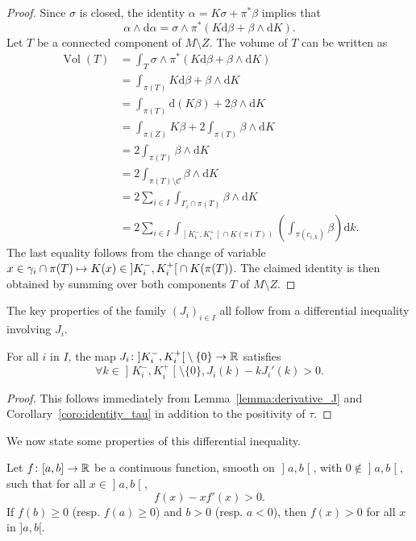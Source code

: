 \documentclass[AHL,Unicode,longabstracts]{cedram}
\DeclareMathOperator{\vol}{Vol}
\newcommand{\bbR}{\mathbb{R}}
\newcommand{\clC}{\mathcal{C}}
\newcommand{\rmd}{\mathrm{d}}
\renewcommand*{\to}{\mathchoice{\longrightarrow}{\rightarrow}{\rightarrow}{\rightarrow}}
\let\oldmapsto\mapsto
\renewcommand*{\mapsto}{\mathchoice{\longmapsto}{\oldmapsto}{\oldmapsto}{\oldmapsto}}
\let\oldforall\forall
\renewcommand*{\forall}{\mathrel{\oldforall}}
\begin{document}
\begin{proof}
Since $\sigma$ is closed, the identity $\alpha = K \sigma + \pi ^* \beta$ implies that
\[
\alpha \wedge \rmd \alpha = \sigma \wedge \pi^* (K \rmd \beta + \beta \wedge \rmd K).
\]
Let $T$ be a connected component of $M \setminus Z$. The volume of $T$ can be written as
\begin{align*}
\vol(T)&= \int_T \sigma \wedge \pi^* (K \rmd \beta + \beta \wedge \rmd K) \\
&=\int_{\pi(T)} K \rmd \beta + \beta \wedge \rmd K \\
&=\int_{\pi(T)} \rmd (K \beta) + 2 \beta \wedge \rmd K \\
&=\int_{\pi(Z)}K \beta + 2\int_{\pi(T)} \beta \wedge \rmd K \\
&=2\int_{\pi(T)} \beta \wedge \rmd K \\
&=2\int_{\pi(T) \setminus \clC} \beta \wedge \rmd K \\
&=2\sum_{i \in I} \int_{\Gamma_i \cap \pi(T)} \beta \wedge \rmd K \\
&=2\sum_{i \in I} \int_{\mathopen{]}K_i^-, K_i^+\mathclose{[} \cap K(\pi(T))} \left(\int_{\pi(c_{i,k})}\beta\right) \rmd k.
\end{align*}
The last equality follows from the change of variable $x \in \gamma_i \cap \pi(T) \mapsto K(x) \in\mathopen{]}K_i^-, K_i^+\mathclose{[}\cap K(\pi(T))$. The claimed identity is then obtained by summing over both components $T$ of $M \setminus Z$.
\end{proof}

The key properties of the family $(J_i)_{i \in I}$ all follow from a differential inequality involving $J_i$.

\begin{prop}\label{prop:ineq_diff_J}
For all $i$ in $I$, the map $J_i \colon\mathopen{]}K_i^-, K_i^+\mathclose{[}\setminus\{0\} \to \bbR$ satisfies
\[
\forall k \in\mathopen{]}K_i^-, K_i^+\mathclose{[}\setminus\{0\}, J_i(k) - k J_i'(k) > 0.
\]
\end{prop}

\begin{proof}
This follows immediately from Lemma~\ref{lemma:derivative_J} and Corollary~\ref{coro:identity_tau} in addition to the positivity of $\tau$.
\end{proof}

We now state some properties of this differential inequality.

\begin{lemm}\label{lemma:proprietes_J}
Let $f \colon [a,b] \to \bbR$ be a continuous function, smooth on $\mathopen{]}a,b\mathclose{[}$, with $0 \notin\mathopen{]}a,b\mathclose{[}$, such that for all $x \in\mathopen{]}a,b\mathclose{[}$,
\begin{equation}
f(x) - x f'(x) > 0.\label{eq:ineq_diff}
\end{equation}
If $f(b) \geq 0$ (resp. $f(a) \geq 0$) and $b > 0$ (resp. $a < 0$), then $f(x) > 0$ for all $x$ in $]a,b[$.
\end{lemm}
\end{document}
